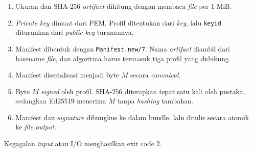 \begin{enumerate}
  \item Ukuran dan SHA-256 \textit{artifact} dihitung dengan membaca \textit{file} per 1 MiB.
  \item \textit{Private key} dimuat dari PEM. Profil ditentukan dari \textit{key}, lalu \texttt{keyid} diturunkan
    dari \textit{public key} turunannya.
  \item Manifest dibentuk dengan \texttt{Manifest.new/7}. Nama \textit{artifact} diambil dari basename
    \textit{file}, dan algoritma harus termasuk tiga profil yang didukung.
  \item Manifest diserialisasi menjadi byte $M$ secara \textit{canonical}.
  \item Byte $M$ \textit{signed} oleh profil. SHA-256 diterapkan tepat satu kali oleh pustaka,
    sedangkan Ed25519 menerima $M$ tanpa \textit{hashing} tambahan.
  \item Manifest dan \textit{signature} dibungkus ke dalam bundle, lalu ditulis secara atomik
    ke \textit{file} \textit{output}.
\end{enumerate}

Kegagalan \textit{input} atau I/O menghasilkan exit code 2.


